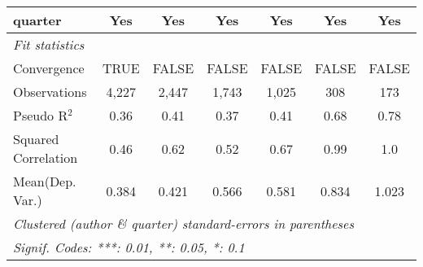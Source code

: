 \begin{tabular}{lcccccc}
   quarter                                                    & Yes           & Yes           & Yes          & Yes           & Yes        & Yes\\  
   \midrule
   \emph{Fit statistics}\\
   Convergence                                                &TRUE           & FALSE         & FALSE        & FALSE         & FALSE      & FALSE\\  
   Observations                                               & 4,227         & 2,447         & 1,743        & 1,025         & 308        & 173\\  
   Pseudo R$^2$                                               & 0.36          & 0.41          & 0.37         & 0.41          & 0.68       & 0.78\\  
   Squared Correlation                                        & 0.46          & 0.62          & 0.52         & 0.67          & 0.99       & 1.0\\  
Mean(Dep. Var.) & 0.384 & 0.421 & 0.566 & 0.581 & 0.834 & 1.023 \\
   \midrule \midrule
   \multicolumn{7}{l}{\emph{Clustered (author \& quarter) standard-errors in parentheses}}\\
   \multicolumn{7}{l}{\emph{Signif. Codes: ***: 0.01, **: 0.05, *: 0.1}}\\
\end{tabular}
\par\endgroup

